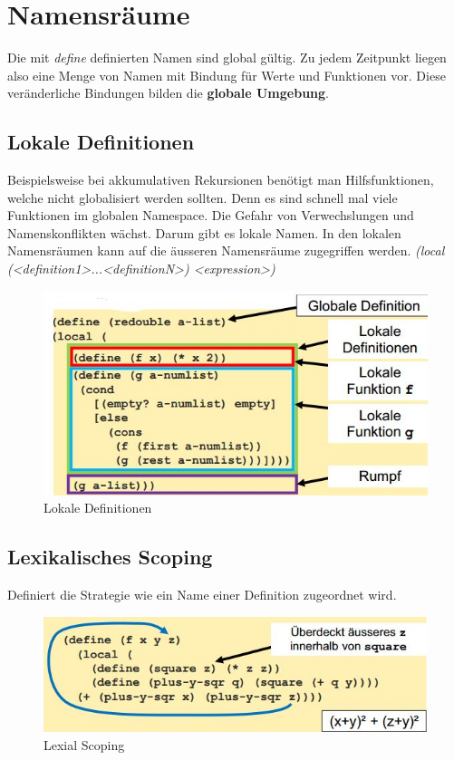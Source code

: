 \newpage
\section{Namensräume}
Die mit \emph{define} definierten Namen sind global gültig. Zu jedem Zeitpunkt liegen also eine Menge von Namen mit Bindung für Werte und Funktionen vor. Diese veränderliche Bindungen bilden die \textbf{globale Umgebung}.
	
\subsection{Lokale Definitionen}
Beispielsweise bei akkumulativen Rekursionen benötigt man Hilfsfunktionen, welche nicht globalisiert werden sollten. Denn es sind schnell mal viele Funktionen im globalen Namespace. Die Gefahr von Verwechslungen und Namenskonflikten wächst. Darum gibt es lokale Namen. In den lokalen Namensräumen kann auf die äusseren Namensräume zugegriffen werden. \emph{(local (<definition1>...<definitionN>) <expression>)}

\begin{figure}[h!]
\centering
\includegraphics[width=0.7\linewidth]{fig/scheme-local-definition}
\caption{Lokale Definitionen}
\label{fig:scheme-local-definition}
\end{figure}

\subsection{Lexikalisches Scoping}
Definiert die Strategie wie ein Name einer Definition zugeordnet wird.

\begin{figure}[h!]
\centering
\includegraphics[width=0.7\linewidth]{fig/scheme-lexial-scoping}
\caption{Lexial Scoping}
\label{fig:scheme-lexial-scoping}
\end{figure}

